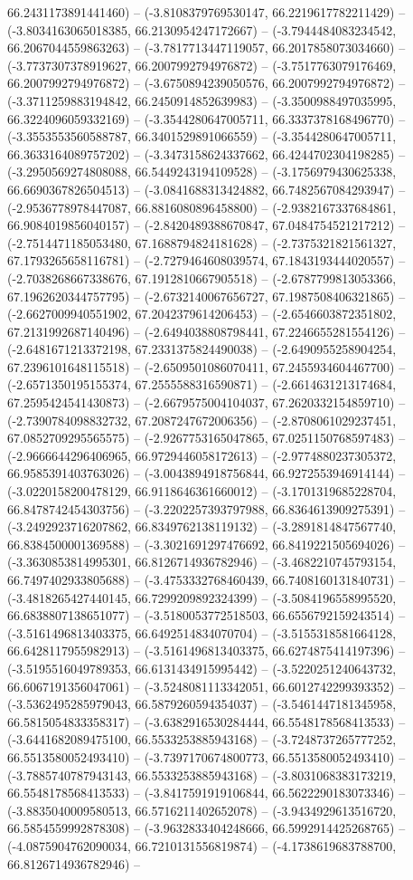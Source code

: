 66.2431173891441460) -- (-3.8108379769530147, 66.2219617782211429) -- (-3.8034163065018385, 66.2130954247172667) -- (-3.7944484083234542, 66.2067044559863263) -- (-3.7817713447119057, 66.2017858073034660) -- (-3.7737307378919627, 66.2007992794976872) -- (-3.7517763079176469, 66.2007992794976872) -- (-3.6750894239050576, 66.2007992794976872) -- (-3.3711259883194842, 66.2450914852639983) -- (-3.3500988497035995, 66.3224096059332169) -- (-3.3544280647005711, 66.3337378168496770) -- (-3.3553553560588787, 66.3401529891066559) -- (-3.3544280647005711, 66.3633164089757202) -- (-3.3473158624337662, 66.4244702304198285) -- (-3.2950569274808088, 66.5449243194109528) -- (-3.1756979430625338, 66.6690367826504513) -- (-3.0841688313424882, 66.7482567084293947) -- (-2.9536778978447087, 66.8816080896458800) -- (-2.9382167337684861, 66.9084019856040157) -- (-2.8420489388670847, 67.0484754521217212) -- (-2.7514471185053480, 67.1688794824181628) -- (-2.7375321821561327, 67.1793265658116781) -- (-2.7279464608039574, 67.1843193444020557) -- (-2.7038268667338676, 67.1912810667905518) -- (-2.6787799813053366, 67.1962620344757795) -- (-2.6732140067656727, 67.1987508406321865) -- (-2.6627009940551902, 67.2042379614206453) -- (-2.6546603872351802, 67.2131992687140496) -- (-2.6494038808798441, 67.2246655281554126) -- (-2.6481671213372198, 67.2331375824490038) -- (-2.6490955258904254, 67.2396101648115518) -- (-2.6509501086070411, 67.2455934604467700) -- (-2.6571350195155374, 67.2555588316590871) -- (-2.6614631213174684, 67.2595424541430873) -- (-2.6679575004104037, 67.2620332154859710) -- (-2.7390784098832732, 67.2087247672006356) -- (-2.8708061029237451, 67.0852709295565575) -- (-2.9267753165047865, 67.0251150768597483) -- (-2.9666644296406965, 66.9729446058172613) -- (-2.9774880237305372, 66.9585391403763026) -- (-3.0043894918756844, 66.9272553946914144) -- (-3.0220158200478129, 66.9118646361660012) -- (-3.1701319685228704, 66.8478742454303756) -- (-3.2202257393797988, 66.8364613909275391) -- (-3.2492923716207862, 66.8349762138119132) -- (-3.2891814847567740, 66.8384500001369588) -- (-3.3021691297476692, 66.8419221505694026) -- (-3.3630853814995301, 66.8126714936782946) -- (-3.4682210745793154, 66.7497402933805688) -- (-3.4753332768460439, 66.7408160131840731) -- (-3.4818265427440145, 66.7299209892324399) -- (-3.5084196558995520, 66.6838807138651077) -- (-3.5180053772518503, 66.6556792159243514) -- (-3.5161496813403375, 66.6492514834070704) -- (-3.5155318581664128, 66.6428117955982913) -- (-3.5161496813403375, 66.6274875414197396) -- (-3.5195516049789353, 66.6131434915995442) -- (-3.5220251240643732, 66.6067191356047061) -- (-3.5248081113342051, 66.6012742299393352) -- (-3.5362495285979043, 66.5879260594354037) -- (-3.5461447181345958, 66.5815054833358317) -- (-3.6382916530284444, 66.5548178568413533) -- (-3.6441682089475100, 66.5533253885943168) -- (-3.7248737265777252, 66.5513580052493410) -- (-3.7397170674800773, 66.5513580052493410) -- (-3.7885740787943143, 66.5533253885943168) -- (-3.8031068383173219, 66.5548178568413533) -- (-3.8417591919106844, 66.5622290183073346) -- (-3.8835040009580513, 66.5716211402652078) -- (-3.9434929613516720, 66.5854559992878308) -- (-3.9632833404248666, 66.5992914425268765) -- (-4.0875904762090034, 66.7210131556819874) -- (-4.1738619683788700, 66.8126714936782946) -- 